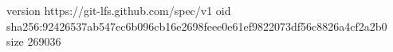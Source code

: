 version https://git-lfs.github.com/spec/v1
oid sha256:92426537ab547ec6b096cb16e2698feee0e61ef9822073df56c8826a4cf2a2b0
size 269036
